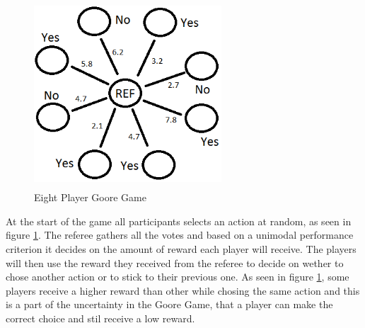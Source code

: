 \begin{figure}[h]
\centering
\includegraphics[height=70mm,width=70mm]{images/goore_game}
\caption{Eight Player Goore Game}
\label{fig:gg}
\end{figure}
At the start of the game all participants selects an action at random, as seen in figure \ref{fig:gg}. The referee
gathers all the votes and based on a unimodal performance criterion it decides on
the amount of reward each player will receive. The players will then use the reward they received from the
referee to decide on wether to chose another action or to stick to their previous one. As seen in figure \ref{fig:gg},
some players receive a higher reward than other while chosing the same action and this is a part
of the uncertainty in the Goore Game, that a player can make the correct choice and stil receive a low
reward.

